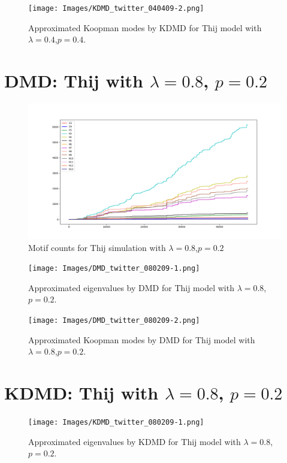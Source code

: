 \begin{figure}
    \texttt{[image: Images/KDMD\_twitter\_040409-2.png]}
    \centering
    \caption{Approximated Koopman modes by KDMD for Thij model
    with $\lambda=0.4$,$p=0.4$.}
\end{figure}


\FloatBarrier

\clearpage

\section{DMD: Thij with $\lambda=0.8$, $p=0.2$}
\begin{figure}
    \includegraphics[width=12cm]{Images/twitter_counts_080209.png}
    \centering
    \caption{Motif counts for Thij simulation with $\lambda=0.8$,$p=0.2$}
\end{figure}

\begin{figure}
    \texttt{[image: Images/DMD\_twitter\_080209-1.png]}
    \centering
    \caption{Approximated eigenvalues by DMD for Thij model
    with $\lambda=0.8$,$p=0.2$.}
\end{figure}

\begin{figure}
    \texttt{[image: Images/DMD\_twitter\_080209-2.png]}
    \centering
    \caption{Approximated Koopman modes by DMD for Thij model
    with $\lambda=0.8$,$p=0.2$.}
\end{figure}


\clearpage
\section{KDMD: Thij with $\lambda=0.8$, $p=0.2$}


\begin{figure}
    \texttt{[image: Images/KDMD\_twitter\_080209-1.png]}
    \centering
    \caption{Approximated eigenvalues by KDMD for Thij model
    with $\lambda=0.8$,$p=0.2$.}
\end{figure}

